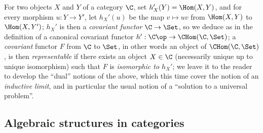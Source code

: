 \begin{env}[8.1.11]
\label{0.8.1.11}
For two objects $X$ and $Y$ of a category $\C$, set $h_X'(Y)=\Hom(X,Y)$, and for every morphism $u:Y\to Y'$, let $h_X'(u)$ be the map $v\mapsto uv$ from $\Hom(X,Y)$ to $\Hom(X,Y')$; $h_X'$ is then a \emph{covariant functor $\C\to\Set$}, so we deduce as in  the definition of a canonical covariant functor $h':\C\op\to\CHom(\C,\Set)$; a \emph{covariant} functor $F$ from $\C$ to $\Set$, in other words an object of $\CHom(\C,\Set)$, is then \emph{representable} if there exists an object $X\in\C$ (necessarily unique up to unique isomorphism) such that $F$ is \emph{isomorphic to $h_X'$}; we leave it to the reader to develop the ``dual'' notions of the above, which this time cover the notion of an \emph{inductive limit}, and in particular the usual notion of a ``solution to a universal problem''.
\end{env}

\subsection{Algebraic structures in categories}
\label{subsection:0.8.2}

